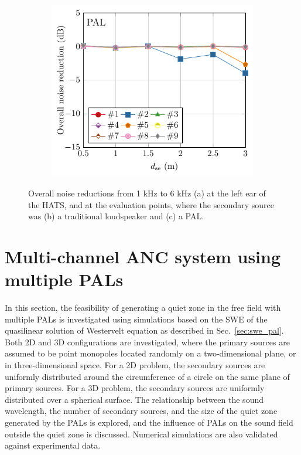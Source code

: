 \begin{figure}[!htb]
\begin{subfigure}{0.32\textwidth}
        \caption{}
    \end{subfigure}
    \begin{subfigure}{0.32\textwidth}
        \centering
        \includegraphics[width = \textwidth]{fig/PAL_ChangeSec_eval_TotalNR.pdf}
        \caption{}
    \end{subfigure}
    \caption{Overall noise reductions from 1 kHz to 6 kHz (a) at the left ear of the HATS, and at the evaluation points, where the secondary source was (b) a traditional loudspeaker and (c) a PAL.}
    \label{fig:ancpal_exp_overall_nr}
\end{figure}


\section{Multi-channel ANC system using multiple PALs}
\label{sec:anpalqz}
In this section, the feasibility of generating a quiet zone in the free field with multiple PALs is investigated using simulations based on the SWE of the quasilinear solution of Westervelt equation as described in Sec.~\ref{sec:swe_pal}.
Both 2D and 3D configurations are investigated, where the primary sources are assumed to be point monopoles located randomly on a two-dimensional plane, or in three-dimensional space. 
For a 2D problem, the secondary sources are uniformly distributed around the circumference of a circle on the same plane of primary sources. 
For a 3D problem, the secondary sources are uniformly distributed over a spherical surface. 
The relationship between the sound wavelength, the number of secondary sources, and the size of the quiet zone generated by the PALs is explored, and the influence of PALs on the sound field outside the quiet zone is discussed. 
Numerical simulations are also validated against experimental data.
